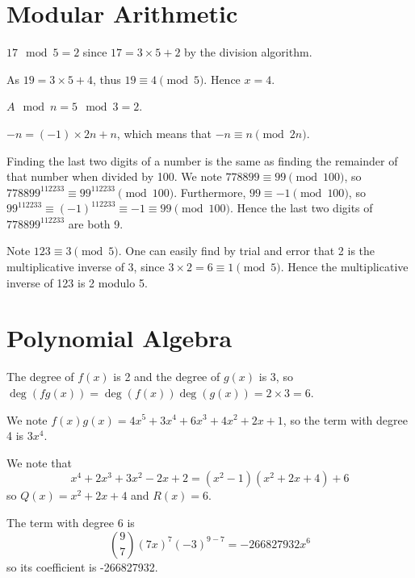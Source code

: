 \section{Modular Arithmetic}
\begin{questions}
    \item \begin{partquestions}{\alph*}
        \item $17 \mod 5 = 2$ since $17 = 3 \times 5 + 2$ by the division algorithm.
        \item As $19 = 3 \times 5 + 4$, thus $19 \equiv 4 \pmod 5$. Hence $x = 4$.
        \item $A \mod n = 5 \mod 3 = 2$.
    \end{partquestions}
    \item $-n = (-1) \times 2n + n$, which means that $-n \equiv n \pmod{2n}$.
    \item Finding the last two digits of a number is the same as finding the remainder of that number when divided by 100. We note $778899 \equiv 99 \pmod{100}$, so $778899^{112233} \equiv 99^{112233} \pmod{100}$. Furthermore, $99 \equiv -1 \pmod{100}$, so $99^{112233}\equiv (-1)^{112233} \equiv -1 \equiv 99 \pmod{100}$. Hence the last two digits of $778899^{112233}$ are both 9.
    \item Note $123 \equiv 3 \pmod 5$. One can easily find by trial and error that 2 is the multiplicative inverse of 3, since $3 \times 2 = 6 \equiv 1 \pmod 5$. Hence the multiplicative inverse of 123 is 2 modulo 5.
\end{questions}

\section{Polynomial Algebra}
\begin{questions}
    \item \begin{partquestions}{\alph*}
        \item The degree of $f(x)$ is 2 and the degree of $g(x)$ is 3, so $\deg(fg(x)) = \deg(f(x))\deg(g(x)) = 2 \times 3 = 6$.
        \item We note $f(x)g(x) = 4x^5+3x^4+6x^3+4x^2+2x+1$, so the term with degree 4 is $3x^4$.
    \end{partquestions}

    \item We note that
    \[
        x^4 + 2x^3 + 3x^2 - 2x + 2 = (x^2 - 1)(x^2+2x+4) + 6
    \]
    so $Q(x) = x^2+2x+4$ and $R(x) = 6$.

    \item The term with degree 6 is
    \[
        {9 \choose 7}(7x)^7(-3)^{9-7} = -266827932x^6
    \]
    so its coefficient is -266827932.
\end{questions}

